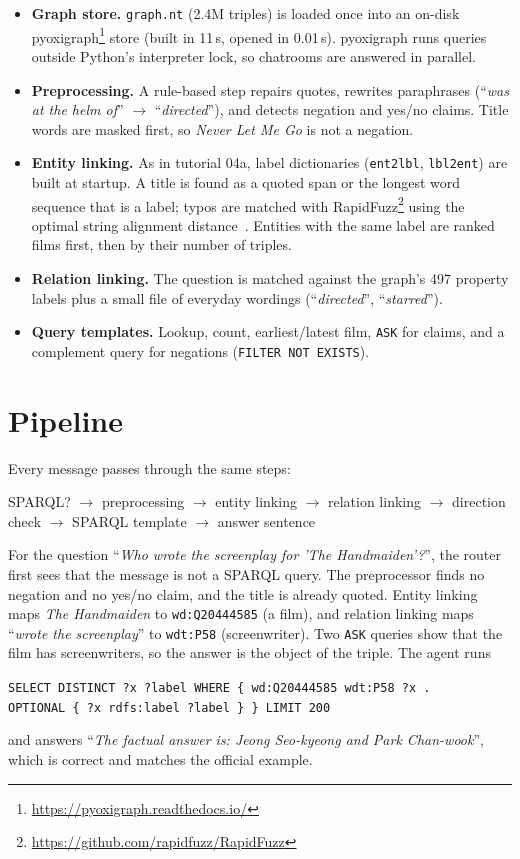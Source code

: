 \documentclass{article}
\begin{document}
\begin{itemize}
    \item \textbf{Graph store.} \texttt{graph.nt} (2.4M triples) is loaded once into an on-disk pyoxigraph\footnote{\url{https://pyoxigraph.readthedocs.io/}} store (built in 11\,s, opened in 0.01\,s). pyoxigraph runs queries outside Python's interpreter lock, so chatrooms are answered in parallel.
    \item \textbf{Preprocessing.} A rule-based step repairs quotes, rewrites paraphrases (``\textit{was at the helm of}'' $\rightarrow$ ``\textit{directed}''), and detects negation and yes/no claims. Title words are masked first, so \textit{Never Let Me Go} is not a negation.
    \item \textbf{Entity linking.} As in tutorial 04a, label dictionaries (\texttt{ent2lbl}, \texttt{lbl2ent}) are built at startup. A title is found as a quoted span or the longest word sequence that is a label; typos are matched with RapidFuzz\footnote{\url{https://github.com/rapidfuzz/RapidFuzz}} using the optimal string alignment distance~\cite{damerau1964technique}. Entities with the same label are ranked films first, then by their number of triples.
    \item \textbf{Relation linking.} The question is matched against the graph's 497 property labels plus a small file of everyday wordings (``\textit{directed}'', ``\textit{starred}'').
    \item \textbf{Query templates.} Lookup, count, earliest/latest film, \texttt{ASK} for claims, and a complement query for negations (\texttt{FILTER NOT EXISTS}).
\end{itemize}

\section{Pipeline}

Every message passes through the same steps:
\begin{center}
SPARQL? $\rightarrow$ preprocessing $\rightarrow$ entity linking $\rightarrow$ relation linking
$\rightarrow$ direction check $\rightarrow$ SPARQL template $\rightarrow$ answer sentence
\end{center}
For the question ``\textit{Who wrote the screenplay for 'The Handmaiden'?}'', the router first sees that the message is not a SPARQL query. The preprocessor finds no negation and no yes/no claim, and the title is already quoted. Entity linking maps \textit{The Handmaiden} to \texttt{wd:Q20444585} (a film), and relation linking maps ``\textit{wrote the screenplay}'' to \texttt{wdt:P58} (screenwriter). Two \texttt{ASK} queries show that the film has screenwriters, so the answer is the object of the triple. The agent runs
\begin{center}
\texttt{SELECT DISTINCT ?x ?label WHERE \{ wd:Q20444585 wdt:P58 ?x .}\\
\texttt{OPTIONAL \{ ?x rdfs:label ?label \} \} LIMIT 200}
\end{center}
and answers ``\textit{The factual answer is: Jeong Seo-kyeong and Park Chan-wook}'', which is correct and matches the official example.
\end{document}
